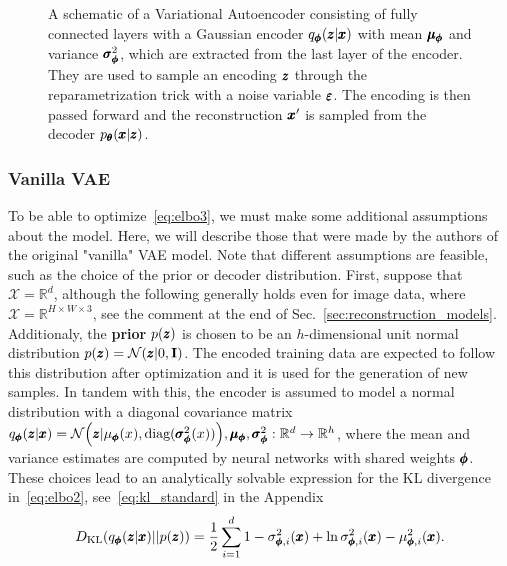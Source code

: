 \begin{figure}
\centering{}
\caption{A schematic of a Variational Autoencoder consisting of fully connected layers with a Gaussian encoder $q_{\pmb{{\phi}}}(\pmb{{z}}|\pmb{{x}})$ with mean $\pmb{{\mu}}_{\pmb{{\phi}}}$ and variance $\pmb{{\sigma}}^2_{\pmb{{\phi}}}$, which are extracted from the last layer of the encoder. They are used to sample an encoding $\pmb{{z}}$ through the reparametrization trick with a noise variable $\pmb{{\varepsilon}}$. The encoding is then passed forward and the reconstruction $\pmb{{x}}'$ is sampled from the decoder $p_{\pmb{{\theta}}}(\pmb{{x}}|\pmb{{z}})$.}
\label{fig:vae}
\end{figure}

\subsubsection{Vanilla VAE}
To be able to optimize~\eqref{eq:elbo3}, we must make some additional assumptions about the model. Here, we will describe those that were made by the authors of the original "vanilla" VAE model. Note that different assumptions are feasible, such as the choice of the prior or decoder distribution. First, suppose that $\mathcal{X} = \mathbb{R}^d$, although the following generally holds even for image data, where $\mathcal{X} = \mathbb{R}^{H \times W\times3}$, see the comment at the end of Sec.~\ref{sec:reconstruction_models}. Additionaly, the \textbf{prior} $p(\pmb{{z}})$ is chosen to be an $h$-dimensional unit normal distribution $p(\pmb{{z}})=\mathcal{N}(\pmb{{z}}|0,\textbf{I})$. The encoded training data are expected to follow this distribution after optimization and it is used for the generation of new samples. In tandem with this, the encoder is assumed to model a normal distribution with a diagonal covariance matrix $q_{\vc{\phi}}(\vc{z}|\vc{x})=\mathcal{N}\left(\vc{z}|\mu_{\vc{\phi}}(x), \text{diag}(\vc{\sigma}^2_{\vc{\phi}}(x))\right), \vc{\mu}_{\vc{\phi}}, \vc{\sigma}^2_{\vc{\phi}}:\mathbb{R}^d \rightarrow \mathbb{R}^h$, where the mean and variance estimates are computed by neural networks with shared weights $\pmb{{\phi}}$. These choices lead to an analytically solvable expression for the KL divergence in~\eqref{eq:elbo2}, see~\eqref{eq:kl_standard} in the Appendix
\begin{equation} \label{eq:vae_kld}
D_{\text{KL}}\left(q_{\vc{\phi}}(\vc{z}|\vc{x})||p(\vc{z}) \right) = \frac{1}{2}\sum_{i=1}^{d} 1-\sigma_{\vc{\phi},i}^{2}(\vc{x})+\ln \sigma_{\vc{\phi},i}^{2}(\vc{x}) -\mu_{\vc{\phi},i}^{2}(\vc{x}).
\end{equation}

